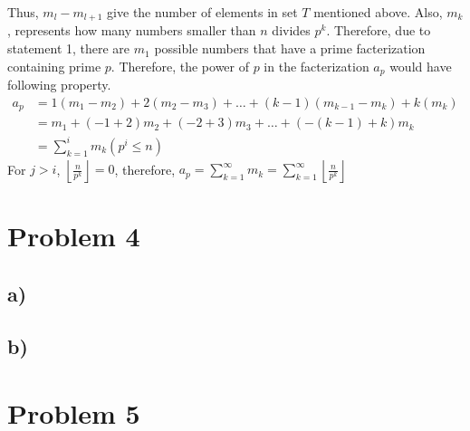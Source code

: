 \documentclass{article}
\begin{document}
Thus, \(m_l - m_{l+1}\) give the number of elements in set \(T\) mentioned above. Also, \(m_k\), represents how many numbers smaller than \(n\) 
divides \(p^k\). Therefore, due to statement 1, there are \(m_1\) possible numbers that have a prime facterization containing prime \(p\).
Therefore, the power of \(p\) in the facterization \(a_p\) would have following property.
\begin{align*}
    a_p&=1(m_1-m_2)+2(m_2-m_3)+\dots+(k-1)(m_{k-1}-m_k)+k(m_k)\\
        &=m_1+(-1+2)m_2+(-2+3)m_3+\dots+(-(k-1)+k)m_k\\
        &=\sum_{k=1}^i m_k (p^i\leqslant n)
\end{align*}
For \(j>i\), \(\left\lfloor \frac{n}{p^k}\right\rfloor = 0\), therefore, \(\displaystyle{a_p = \sum_{k=1}^\infty m_k=\sum^\infty_{k=1} \left\lfloor \frac{n}{p^k}\right\rfloor}\)

























\newpage
\section*{Problem 4}
\subsection*{a)}
\subsection*{b)}
\section*{Problem 5}
\end{document}
